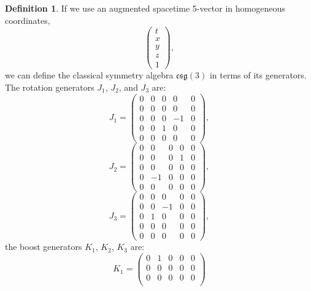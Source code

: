 \documentclass{amsart}
\theoremstyle{definition}
\newtheorem{definition}{Definition}[theorem]
\theoremstyle{remark}
\begin{document}
\begin{definition}
  If we use an augmented spacetime 5-vector in homogeneous coordinates,
  \begin{equation*}
  \begin{pmatrix}
    t \\
    x \\
    y \\
    z \\
    1
  \end{pmatrix},
  \end{equation*}
  we can define the classical symmetry algebra $\mathfrak{csg}(3)$ in terms of its generators. The rotation generators $J_1$, $J_2$, and $J_3$ are:
  \begin{equation*}
  J_1 =
  \begin{pmatrix}
    0 & 0 & 0 & 0 & 0 \\
    0 & 0 & 0 & 0 & 0 \\
    0 & 0 & 0 & -1 & 0 \\
    0 & 0 & 1 & 0 & 0 \\
    0 & 0 & 0 & 0 & 0
  \end{pmatrix},
  \end{equation*}
  \begin{equation*}
  J_2 =
  \begin{pmatrix}
    0 & 0 & 0 & 0 & 0 \\
    0 & 0 & 0 & 1 & 0 \\
    0 & 0 & 0 & 0 & 0 \\
    0 & -1 & 0 & 0 & 0 \\
    0 & 0 & 0 & 0 & 0
  \end{pmatrix},
  \end{equation*}
  \begin{equation*}
  J_3 =
  \begin{pmatrix}
    0 & 0 & 0 & 0 & 0 \\
    0 & 0 & -1 & 0 & 0 \\
    0 & 1 & 0 & 0 & 0 \\
    0 & 0 & 0 & 0 & 0 \\
    0 & 0 & 0 & 0 & 0
  \end{pmatrix},
  \end{equation*}
  the boost generators $K_1$, $K_2$, $K_3$ are:
  \begin{equation*}
  K_1 =
  \begin{pmatrix}
    0 & 1 & 0 & 0 & 0 \\
    0 & 0 & 0 & 0 & 0 \\
    0 & 0 & 0 & 0 & 0 \\

\end{pmatrix}
\end{equation*}
\end{definition}
\end{document}
